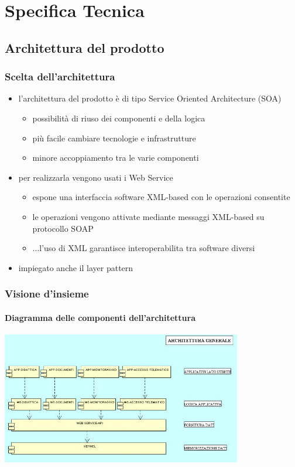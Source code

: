 \section{Specifica Tecnica}
\subsection{Architettura del prodotto}

\begin{frame}
\frametitle{Scelta dell'architettura}

\begin{itemize}
\item l'architettura del prodotto è di tipo \alert{Service Oriented Architecture} (SOA)
\begin{itemize}
\item possibilità di riuso dei componenti e della logica
\item più facile cambiare tecnologie e infrastrutture
\item minore accoppiamento tra le varie componenti
\end{itemize}
\item per realizzarla vengono usati i \alert{Web Service}
\begin{itemize}
	\item espone una \alert{interfaccia} software XML-based con le operazioni consentite
	\item le operazioni vengono attivate mediante \alert{messaggi} XML-based su protocollo SOAP
	\item ...l'uso di XML garantisce \alert{interoperabilita} tra software diversi
	
\end{itemize}
\item impiegato anche il \alert{layer pattern}

\end{itemize}

\end{frame}

\begin{frame}
  \frametitle{Visione d'insieme}
  \framesubtitle{Diagramma delle componenti dell'architettura}

\begin{center}
  \includegraphics[width=10.5cm]{img/ArchitetturaGenerale.png}
\end{center}

\end{frame}

